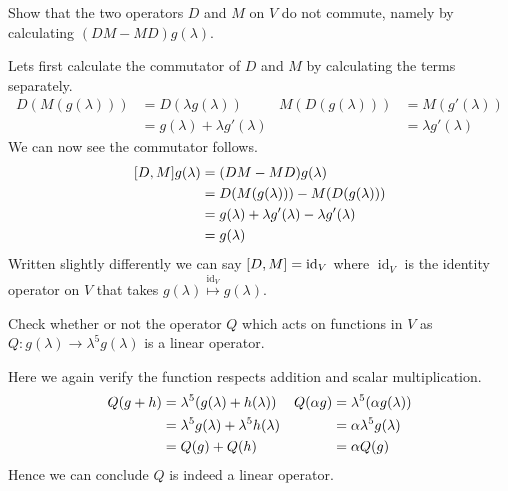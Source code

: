 \documentclass[boxes,pages]{homework}
\makeatletter
\DeclareMathOperator{\id}{id}
\numberwithin{@problem}{section}
\makeatother
\begin{document}
\begin{problem}
Show that the two operators $D$ and $M$ on $V$ do not commute, namely by calculating $(DM-MD)g(\lambda)$.
\end{problem}

\begin{solution}
	Lets first calculate the commutator of $D$ and $M$ by calculating the terms separately.
	\begin{align*}
		D(M(g(\lambda))) & = D(\lambda g(\lambda))            & M(D(g(\lambda))) & = M(g'(\lambda))      \\
		                 & = g(\lambda) + \lambda g'(\lambda) &                  & = \lambda g'(\lambda)
	\end{align*}
	We can now see the commutator follows.
	\begin{align*}
		\comm{D}{M}g(\lambda) & = (DM-MD)g(\lambda)                                      \\
		                      & = D(M(g(\lambda))) - M(D(g(\lambda)))                    \\
		                      & = g(\lambda) + \lambda g'(\lambda) - \lambda g'(\lambda) \\
		                      & = g(\lambda)
	\end{align*}
	Written slightly differently we can say $\comm{D}{M} = \id_V$ where $\id_V$ is the identity operator on $V$ that takes $g(\lambda)\stackrel{\id_V}{\longmapsto}g(\lambda)$.
\end{solution}

\begin{problem}
Check whether or not the operator $Q$ which acts on functions in $V$ as $Q: g(\lambda)\to \lambda^5g(\lambda)$ is a linear operator.
\end{problem}

\begin{solution}
	Here we again verify the function respects addition and scalar multiplication.
	\begin{align*}
		Q(g + h) & = \lambda^5\qty(g(\lambda) + h(\lambda))      & Q(\alpha g) & = \lambda^5(\alpha g(\lambda)) \\
		         & = \lambda^5 g(\lambda) + \lambda^5 h(\lambda) &             & = \alpha\lambda^5 g(\lambda)   \\
		         & = Q(g) + Q(h)                                 &             & = \alpha Q(g)                  \\
	\end{align*}
	Hence we can conclude $Q$ is indeed a linear operator.
\end{solution}
\end{document}
